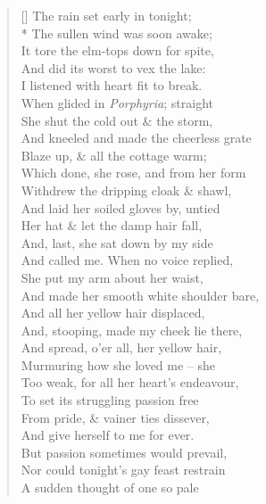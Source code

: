 \documentclass[MAIN]{subfiles}
\begin{document}
\settowidth{\versewidth}{And kneeled and made the cheerless grate}
\begin{verse}[\versewidth]
The rain set early in tonight;\\*
\vin The sullen wind was soon awake;\\
It tore the elm-tops down for spite,\\
\vin And did its worst to vex the lake:\\
\vin I listened with heart fit to break.\\
When glided in \emph{Porphyria}; straight\\
\vin She shut the cold out \& the storm,\\
And kneeled and made the cheerless grate\\
\vin Blaze up, \& all the cottage warm;\\
\vin Which done, she rose, and from her form\\
Withdrew the dripping cloak \& shawl,\\
\vin And laid her soiled gloves by, untied\\
Her hat \& let the damp hair fall,\\
\vin And, last, she sat down by my side\\
\vin And called me. When no voice replied,\\
She put my arm about her waist,\\
\vin And made her smooth white shoulder bare,\\
And all her yellow hair displaced,\\
\vin And, stooping, made my cheek lie there,\\
\vin And spread, o'er all, her yellow hair,\\
Murmuring how she loved me -- she\\
\vin Too weak, for all her heart's endeavour,\\
To set its struggling passion free\\
\vin From pride, \& vainer ties dissever,\\
\vin And give herself to me for ever.\\
But passion sometimes would prevail,\\
\vin Nor could tonight's gay feast restrain\\
A sudden thought of one so pale\\

\end{verse}
\end{document}
